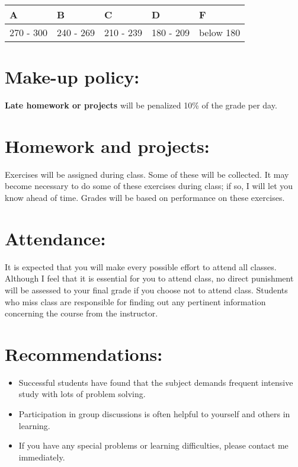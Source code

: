 \documentclass[11pt]{article}
\begin{document}
\begin{center}
\begin{tabular}{lllll}
\hline
 A          &  B          &  C          &  D          &  F          \\
\hline
 270 - 300  &  240 - 269  &  210 - 239  &  180 - 209  &  below 180  \\
\hline
\end{tabular}
\end{center}
\section*{Make-up policy:}
\label{sec-4}

\textbf{Late homework or projects} will be penalized 10\% of the grade per day. 
\section*{Homework and projects:}
\label{sec-5}

Exercises will be assigned during class. Some of these will be collected. It may become necessary to do some of these exercises during class; if so, I will let you know ahead of time. Grades will be based on performance on these exercises. 
\section*{Attendance:}
\label{sec-6}

It is expected that you will make every possible effort to attend all classes. Although I feel that it is essential for you to attend class, no direct punishment will be assessed to your final grade if you choose not to attend class. Students who miss class are responsible for finding out any pertinent information concerning the course from the instructor. 
\section*{Recommendations:}
\label{sec-7}

\begin{itemize}
\item Successful students have found that the subject demands frequent intensive study with lots of problem solving.
\item Participation in group discussions is often helpful to yourself and others in learning.
\item If you have any special problems or learning difficulties, please contact me immediately.
\end{itemize}
\end{document}
